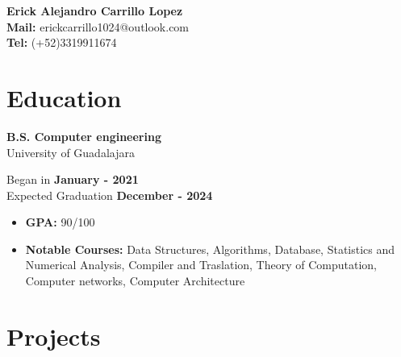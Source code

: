\documentclass[11pt]{article}
\begin{document}
 \thispagestyle{empty}
\begin{center}
\Large{\textbf{Erick Alejandro Carrillo Lopez} \\
  \textbf{Mail:} erickcarrillo1024@outlook.com\\
  \textbf{Tel:} (+52)3319911674}
\quad\quad \href{https://github.com/alecksandr26}{\color{blue}{Github}}
  \quad\quad \href{https://www.linkedin.com/in/erick-alejandro-carrillo-lopez-988112219/}{\color{blue}{Linkedin}}
\end{center}
\vspace{-0.5cm}
\section*{Education}
\vspace{-0.4cm}
\titlerule[0.3pt]
\vspace{-0.4cm}

\begin{multicols}{2}
  \noindent
  \textbf{B.S. Computer engineering}\\
  University of Guadalajara
  
  \columnbreak
  \noindent
  Began in \textbf{January - 2021}\\
  Expected Graduation \textbf{December -  2024}
\end{multicols}
\vspace{-0.3cm}
\begin{itemize}[noitemsep, nolistsep]
\item \textbf{GPA:} 90/100
\item \textbf{Notable Courses:} Data Structures, Algorithms, Database, Statistics and Numerical Analysis,
  Compiler and Traslation, Theory of Computation, Computer networks, Computer Architecture
\end{itemize}
\vspace{-0.4cm}
\section*{Projects}
\vspace{-0.4cm}
\titlerule[0.3pt]
\vspace{0.1cm}
\end{document}
